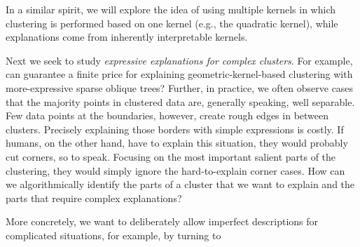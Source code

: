 \documentclass[a4paper,11pt]{article}
\begin{document}

In a similar spirit, we will explore the idea of using multiple kernels 
in which clustering is performed based on one kernel (e.g., the quadratic kernel), 
while explanations come from inherently interpretable kernels.

Next we seek to study \emph{expressive explanations for complex clusters}.
For example, can guarantee a finite price for explaining geometric-kernel-based clustering with more-expressive sparse oblique trees?
Further, in practice, we often observe cases that the majority points in clustered data are, generally speaking, well separable.
Few data points at the boundaries, however, create rough edges in between clusters.
Precisely explaining those borders with simple expressions is costly.
If humans, on the other hand, have to explain this situation, they would probably cut corners, so to speak.
Focusing on the most important salient parts of the clustering, they would simply ignore the hard-to-explain corner cases.
How can we algorithmically identify the parts of a cluster that we want to explain and the parts that require complex explanations?

More concretely, we want to deliberately allow imperfect descriptions for complicated situations,
for example, by turning to 
\end{document}
